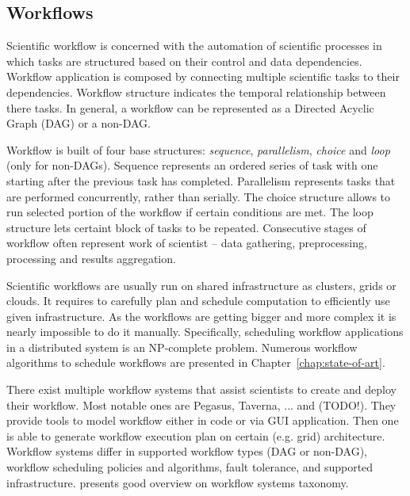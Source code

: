 \subsection{Workflows}
\label{intro:workflow}

Scientific workflow is concerned with the automation of scientific processes in which tasks are structured based on their control and data dependencies. Workflow application is composed by connecting multiple scientific tasks to their dependencies. Workflow structure indicates the temporal relationship between there tasks. In general, a workflow can be represented as a Directed Acyclic Graph (DAG) or a non-DAG. 

Workflow is built of four base structures: \emph{sequence}, \emph{parallelism}, \emph{choice} and \emph{loop} (only for non-DAGs). Sequence represents an ordered series of task with one starting after the previous task has completed. Parallelism represents tasks that are performed concurrently, rather than serially. The choice structure allows to run selected portion of the workflow if certain conditions are met. The loop structure lets certaint block of tasks to be repeated. Consecutive stages of workflow often represent work of scientist – data gathering, preprocessing, processing and results aggregation.

Scientific workflows are usually run on shared infrastructure as clusters, grids or clouds. It requires to carefully plan and schedule computation to efficiently use given infrastructure. As the workflows are getting bigger and more complex it is nearly impossible to do it manually. Specifically, scheduling workflow applications in a distributed system is an NP-complete problem. Numerous workflow algorithms to schedule workflows are presented in Chapter \ref{chap:state-of-art}.

There exist multiple workflow systems that assist scientists to create and deploy their workflow. Most notable ones are Pegasus, Taverna, ... and (TODO!). They provide tools to model workflow either in code or via GUI application. Then one is able to generate workflow execution plan on certain (e.g. grid) architecture. Workflow systems differ in supported workflow types (DAG or non-DAG), workflow scheduling policies and algorithms, fault tolerance, and supported infrastructure.  \cite{Yu:2005:TSW:1084805.1084814} presents good overview on workflow systems taxonomy.

